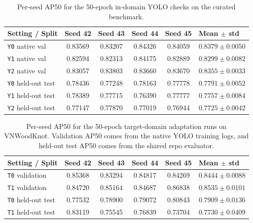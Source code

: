 \documentclass[journal,article,submit,moreauthors,pdftex]{Definitions/tsp}
\begin{document}
\begin{table}[t]
  \centering
  \caption{Per-seed AP50 for the 50-epoch in-domain YOLO checks on the curated benchmark.}
  \label{tab:app-curated-perseed}
  \scriptsize
  \setlength{\tabcolsep}{4pt}
  \begin{tabularx}{\textwidth}{>{\raggedright\arraybackslash}p{} c c c c X}
    \toprule
    Setting / Split & Seed 42 & Seed 43 & Seed 44 & Seed 45 & Mean $\pm$ std \\
    \midrule
    \texttt{Y0} native val & 0.83569 & 0.83207 & 0.84326 & 0.84059 & $0.8379 \pm 0.0050$ \\
    \texttt{Y1} native val & 0.82594 & 0.82313 & 0.84175 & 0.82889 & $0.8299 \pm 0.0082$ \\
    \texttt{Y2} native val & 0.83057 & 0.83803 & 0.83660 & 0.83670 & $0.8355 \pm 0.0033$ \\
    \texttt{Y0} held-out test & 0.78436 & 0.77248 & 0.78163 & 0.77778 & $0.7791 \pm 0.0052$ \\
    \texttt{Y1} held-out test & 0.78389 & 0.77715 & 0.76390 & 0.77777 & $0.7757 \pm 0.0084$ \\
    \texttt{Y2} held-out test & 0.77147 & 0.77870 & 0.77019 & 0.76944 & $0.7725 \pm 0.0042$ \\
    \bottomrule
  \end{tabularx}
\end{table}

\begin{table}[t]
  \centering
  \caption{Per-seed AP50 for the 50-epoch target-domain adaptation runs on VNWoodKnot. Validation AP50 comes from the native YOLO training logs, and held-out test AP50 comes from the shared repo evaluator.}
  \label{tab:app-transfer-perseed}
  \scriptsize
  \setlength{\tabcolsep}{4pt}
  \begin{tabularx}{\textwidth}{>{\raggedright\arraybackslash}p{} c c c c X}
    \toprule
    Setting / Split & Seed 42 & Seed 43 & Seed 44 & Seed 45 & Mean $\pm$ std \\
    \midrule
    \texttt{T0} validation & 0.85368 & 0.83294 & 0.84817 & 0.84269 & $0.8444 \pm 0.0088$ \\
    \texttt{T1} validation & 0.84720 & 0.85164 & 0.84687 & 0.86838 & $0.8535 \pm 0.0101$ \\
    \texttt{T0} held-out test & 0.77532 & 0.78900 & 0.79072 & 0.80843 & $0.7909 \pm 0.0136$ \\
    \texttt{T1} held-out test & 0.83119 & 0.75545 & 0.76839 & 0.73704 & $0.7730 \pm 0.0409$ \\
    \bottomrule
  \end{tabularx}
\end{table}
\end{document}
